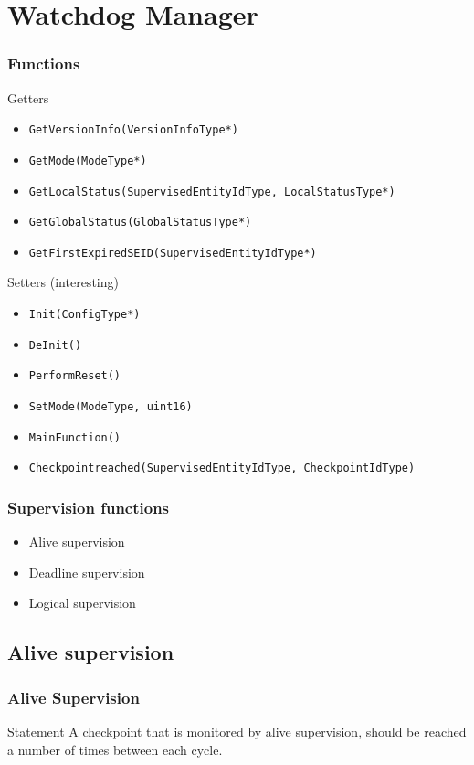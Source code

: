 \documentclass{beamer}
\begin{document}
\section{Watchdog Manager}
\begin{frame}[fragile]
  \frametitle{Functions}
  \begin{block}{Getters}
    \begin{itemize}
      \item \lstinline!GetVersionInfo(VersionInfoType*)!
      \item \lstinline!GetMode(ModeType*)!
      \item \lstinline!GetLocalStatus(SupervisedEntityIdType, LocalStatusType*)!
      \item \lstinline!GetGlobalStatus(GlobalStatusType*)!
      \item \lstinline!GetFirstExpiredSEID(SupervisedEntityIdType*)!
    \end{itemize}
  \end{block}

  \begin{block}{Setters (interesting)}
    \begin{itemize}
      \item \lstinline!Init(ConfigType*)!
      \item \lstinline!DeInit()!
      \item \lstinline!PerformReset()!
      \item \lstinline!SetMode(ModeType, uint16)!
      \item \lstinline!MainFunction()!
      \item \lstinline!Checkpointreached(SupervisedEntityIdType, CheckpointIdType)!
    \end{itemize}
  \end{block}
\end{frame}

\begin{frame}
  \frametitle{Supervision functions}
  \begin{itemize}
    \item Alive supervision
    \item Deadline supervision
    \item Logical supervision
  \end{itemize}
\end{frame}

\subsection{Alive supervision}
\begin{frame}
  \frametitle{Alive Supervision}
  \begin{block}{Statement}
    A checkpoint that is monitored by alive supervision, should be
    reached a number of times between each cycle.
  \end{block}
\end{frame}
\end{document}
